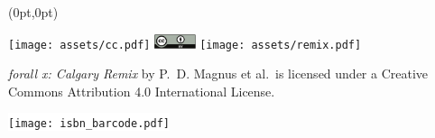 \documentclass{memoir}
\newlength{\coverheight}
\newlength{\spinewidth}
\newlength{\spinepos} %
\begin{document}
\begin{textblock*}{\spinepos}(0pt,0pt)
  \noindent\hspace{1.5cm}
  \begin{minipage}[b][\coverheight][b]{.85\spinepos}
\begin{minipage}[b]{2.5cm}
\texttt{[image: assets/cc.pdf]}
\includegraphics[width=1.2cm]{assets/by.pdf}
\texttt{[image: assets/remix.pdf]}
\end{minipage}
\hspace{.3cm}
\begin{minipage}[b]{4.7cm}
  \fontsize{11pt}{1.2em}\selectfont\color{white}\textit{forall x:
    Calgary Remix} by P.~D. Magnus et al.\ is licensed under a
  Creative Commons Attribution 4.0 International License.

\end{minipage}
\hfill\color{black}
\colorbox{white}{\texttt{[image: isbn\_barcode.pdf]}}

\vspace*{2cm}
  \end{minipage}
  \hfill
\end{textblock*}
\end{document}
